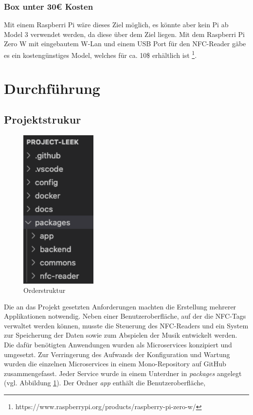 \documentclass[10pt, a4paper]{article}
\begin{document}
\subsubsection{Box unter 30€ Kosten}
Mit einem Raspberri Pi wäre dieses Ziel möglich, es könnte aber kein Pi ab Model 3 verwendet werden, da diese über dem Ziel liegen.
Mit dem Raspberri Pi Zero W mit eingebautem W-Lan und einem USB Port für den NFC-Reader gäbe es ein kostengünstiges Model, welches für ca. 10\$ erhältlich ist \footnote{https://www.raspberrypi.org/products/raspberry-pi-zero-w/}.


\section{Durchführung}

\subsection{Projektstrukur}
\begin{figure}
  \includegraphics[width=3.8cm]{PackageStruktur.png}
  \caption{Orderstruktur}
  \label{fig:Orderstruktur}
\end{figure}
Die an das Projekt gesetzten Anforderungen machten die Erstellung mehrerer Applikationen notwendig. Neben einer Benutzeroberfläche, auf der die NFC-Tags
verwaltet werden können, musste die Steuerung des NFC-Readers und ein System zur Speicherung der Daten sowie zum Abspielen der Musik entwickelt werden.
Die dafür benötigten Anwendungen wurden als Microservices konzipiert und umgesetzt. Zur Verringerung des Aufwands der Konfiguration und Wartung wurden die einzelnen Microservices in einem Mono-Repository auf GitHub zusammengefasst.
Jeder Service wurde in einem Unterdner in \textit{packages} angelegt (vgl. Abbildung \ref{fig:Orderstruktur}). Der Ordner \textit{app} enthält die Benutzeroberfläche,
\end{document}

